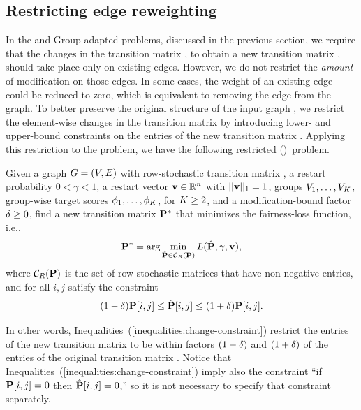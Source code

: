\documentclass[sigconf, anonymous, review]{acmart}
\begin{document}
\iffalse
\subsection{Restricting edge re\-weighting}

In the \phiPageRank and Group-adapted \phiPageRank problems, discussed in the previous section, 
we require that the changes in the transition matrix \transmatrix, 
to obtain a new transition matrix \newtransmatrix, 
should take place only on existing edges.
However, we do not restrict the \emph{amount} of modification on those edges.
In some cases, the weight of an existing edge could be reduced to zero,
which is equivalent to removing the edge from the graph.
To better preserve the original structure of the input graph \graph,
we restrict the element-wise changes in the transition matrix \transmatrix
by introducing lower- and upper-bound constraints on 
the entries of the new transition matrix \newtransmatrix.
Applying this restriction to the \phiPageRank problem,
we have the following restricted \phiPageRank (\resfpr)~problem.

\begin{problem}
Given a graph $G = (V, E)$ with row-stochastic transition matrix \transmatrix, 
a restart probability $0 < \gamma < 1$, 
a restart vector $\mathbf{{v}} \in \mathbb{R}^{n}$ with $||\mathbf{{v}}||_1 = 1$, 
groups $V_1, \ldots, V_K$, 
group-wise target \pagerank scores $\phi_1, \ldots, \phi_K$, 
for $K\ge 2$, 
and a modification-bound factor $\delta \ge 0$,
find a new transition matrix $\mathbf{{P}}^{*}$
that minimizes the fairness-loss function, i.e.,
\begin{equation*}
  \mathbf{{P}}^{*} = \arg \min_{\hat{\mathbf{{P}}} \in \mathcal{C}_R(\mathbf{{P}})} L(\hat{\mathbf{{P}}}, \gamma, \mathbf{{v}}),
\end{equation*}
where $\mathcal{C}_R(\mathbf{{P}})$ is the set of row-stochastic matrices
that have non-negative entries, and for all $i, j$ satisfy the constraint
% 
\begin{equation}
\label{inequalities:change-constraint}
    (1 - \delta) \mathbf{{P}}[i, j] \le \hat{\mathbf{{P}}}[i, j] \le (1 + \delta) \mathbf{{P}}[i, j] .
\end{equation} 
\end{problem}

In other words, Inequalities~(\ref{inequalities:change-constraint})
restrict the entries of the new transition matrix \newtransmatrix
to be within factors $(1 - \delta)$ and $(1 + \delta)$
of the entries of the original transition matrix \transmatrix.
Notice that Inequalities~(\ref{inequalities:change-constraint})
imply also the constraint ``if $\mathbf{{P}}[i, j] = 0$ then $\hat{\mathbf{{P}}}[i, j] = 0$,''
so it is not necessary to specify that constraint separately. 
\end{document}
